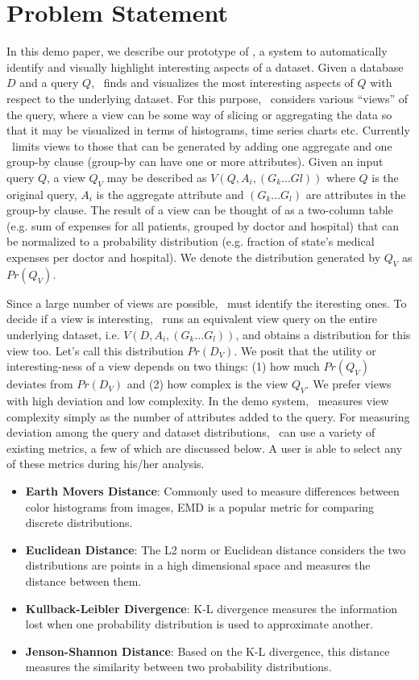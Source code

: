 \section{Problem Statement}
\label{sec:problem_statement}

In this demo paper, we describe our prototype of \SeeDB, a system to
automatically identify and visually highlight interesting aspects of a dataset.
Given a database $D$ and a query $Q$, \SeeDB\ finds and visualizes the most
interesting aspects of $Q$ with respect to the underlying dataset. For this
purpose, \SeeDB\ considers various ``views'' of the query, where a view can be
some way of slicing or aggregating the data so that it may be visualized in
terms of histograms, time series charts etc. Currently \SeeDB\ limits views to
those that can be generated by adding one aggregate and one group-by clause
(group-by can have one or more attributes). Given an input query $Q$, a view
$Q_V$ may be described as $V(Q, A_i, (G_k\ldots Gl))$ where $Q$ is the original
query, $A_i$ is the aggregate attribute and $(G_k\ldots G_l)$ are attributes in
the group-by clause. The result of a view can be thought of as a two-column
table (e.g. sum of expenses for all patients, grouped by doctor and hospital)
that can be normalized to a probability distribution (e.g.
fraction of state's medical expenses per doctor and hospital). We denote the
distribution generated by $Q_V$ as $Pr(Q_V)$.

Since a large number of views are possible, \SeeDB\ must identify the iteresting
ones. To decide if a view is interesting, \SeeDB\ runs an equivalent view query
on the entire underlying dataset, i.e. $V(D, A_i, (G_k\ldots G_l))$, and obtains
a distribution for this view too. Let's call this distribution $Pr(D_V)$. We
posit that the utility or interesting-ness of a view depends on two things: (1)
how much $Pr(Q_V)$ deviates from $Pr(D_V)$ and (2) how complex is the view
$Q_V$. We prefer views with high deviation and low complexity. In the demo
system, \SeeDB\ measures view complexity simply as the number of attributes
added to the query. For measuring deviation among the query and dataset
distributions, \SeeDB\ can use a variety of existing metrics, a few of which are
discussed below. A user is able to select any of these metrics during his/her
analysis.  

\begin{itemize}
  \item {\bf Earth Movers Distance}: Commonly used to measure differences
  between color histograms from images, EMD is a popular metric for comparing
  discrete distributions.
  \item {\bf Euclidean Distance}: The L2 norm or Euclidean distance considers
  the two distributions are points in a high dimensional space and measures the
  distance between them.
  \item {\bf Kullback-Leibler Divergence}: K-L divergence measures the
  information lost when one probability distribution is used to approximate
  another.
  \item {\bf Jenson-Shannon Distance}: Based on the K-L divergence, this
  distance measures the similarity between two probability distributions.
\end{itemize}


